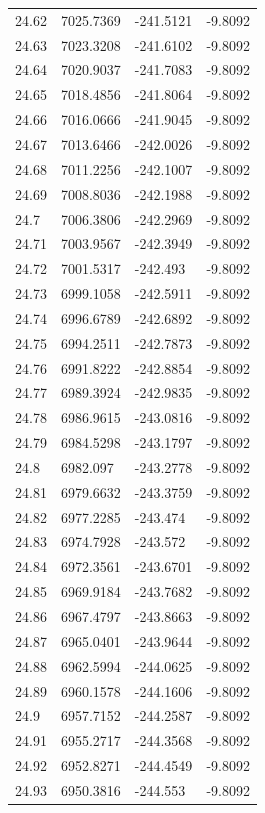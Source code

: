 \begin{table}[H]
\begin{tabular}{llll}
24.62 & 7025.7369 & -241.5121 & -9.8092 \\
24.63 & 7023.3208 & -241.6102 & -9.8092 \\
24.64 & 7020.9037 & -241.7083 & -9.8092 \\
24.65 & 7018.4856 & -241.8064 & -9.8092 \\
24.66 & 7016.0666 & -241.9045 & -9.8092 \\
24.67 & 7013.6466 & -242.0026 & -9.8092 \\
24.68 & 7011.2256 & -242.1007 & -9.8092 \\
24.69 & 7008.8036 & -242.1988 & -9.8092 \\
24.7 & 7006.3806 & -242.2969 & -9.8092 \\
24.71 & 7003.9567 & -242.3949 & -9.8092 \\
24.72 & 7001.5317 & -242.493 & -9.8092 \\
24.73 & 6999.1058 & -242.5911 & -9.8092 \\
24.74 & 6996.6789 & -242.6892 & -9.8092 \\
24.75 & 6994.2511 & -242.7873 & -9.8092 \\
24.76 & 6991.8222 & -242.8854 & -9.8092 \\
24.77 & 6989.3924 & -242.9835 & -9.8092 \\
24.78 & 6986.9615 & -243.0816 & -9.8092 \\
24.79 & 6984.5298 & -243.1797 & -9.8092 \\
24.8 & 6982.097 & -243.2778 & -9.8092 \\
24.81 & 6979.6632 & -243.3759 & -9.8092 \\
24.82 & 6977.2285 & -243.474 & -9.8092 \\
24.83 & 6974.7928 & -243.572 & -9.8092 \\
24.84 & 6972.3561 & -243.6701 & -9.8092 \\
24.85 & 6969.9184 & -243.7682 & -9.8092 \\
24.86 & 6967.4797 & -243.8663 & -9.8092 \\
24.87 & 6965.0401 & -243.9644 & -9.8092 \\
24.88 & 6962.5994 & -244.0625 & -9.8092 \\
24.89 & 6960.1578 & -244.1606 & -9.8092 \\
24.9 & 6957.7152 & -244.2587 & -9.8092 \\
24.91 & 6955.2717 & -244.3568 & -9.8092 \\
24.92 & 6952.8271 & -244.4549 & -9.8092 \\
24.93 & 6950.3816 & -244.553 & -9.8092 \\

\end{tabular}
\end{table}
